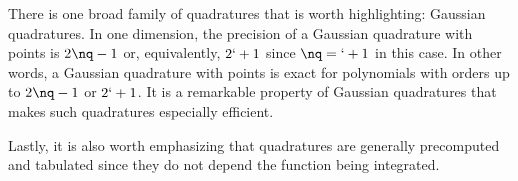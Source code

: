There is one broad family of quadratures that is worth highlighting: Gaussian
quadratures. In one dimension, the precision of a Gaussian quadrature with \nq
points is $2 \nq - 1$ \cite{heiss2008} or, equivalently, $2 \lq + 1$ since $\nq
= \lq + 1$ in this case. In other words, a Gaussian quadrature with \nq points
is exact for polynomials with orders up to $2 \nq - 1$ or $2 \lq + 1$. It is a
remarkable property of Gaussian quadratures that makes such quadratures
especially efficient.

Lastly, it is also worth emphasizing that quadratures are generally precomputed
and tabulated since they do not depend the function being integrated.
